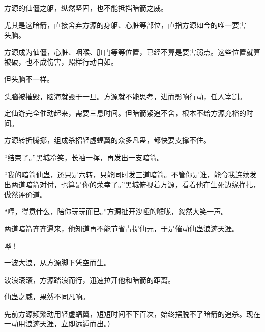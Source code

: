 \begin{this_body}
方源的仙僵之躯，纵然坚固，也不能抵挡暗箭之威。

尤其是这暗箭，直接舍弃方源的身躯、心脏等部位，直指方源如今的唯一要害――头脑。

方源成为仙僵，心脏、咽喉、肛门等等位置，已经不算是要害弱点。这些位置就算被破，也不成伤害，照样行动自如。

但头脑不一样。

头脑被摧毁，脑海就毁于一旦。方源就不能思考，进而影响行动，任人宰割。

定仙游完全催动起来，需要三息时间。但暗箭紧追不舍，根本不给方源充裕的时间。

方源转折腾挪，组成杀招轻虚蝠翼的众多凡蛊，都快要支撑不住。

“结束了。”黑城冷笑，长袖一挥，再发出一支暗箭。

“我的暗箭仙蛊，还只是六转，只能同时发三道暗箭。不管你是谁，能令我连续发出两道暗箭对付，也算是你的荣幸了。”黑城俯视着方源，看着他在生死边缘挣扎，傲然评价道。

“哼，得意什么，陪你玩玩而已。”方源扯开沙哑的喉咙，忽然大笑一声。

两道暗箭齐齐逼来，他知道再不能节省青提仙元，于是催动仙蛊浪迹天涯。

哗！

一波大浪，从方源脚下凭空而生。

波浪滚滚，方源踏浪而行，迅速拉开他和暗箭的距离。

仙蛊之威，果然不同凡响。

先前方源频繁动用轻虚蝠翼，短短时间不下百次，始终摆脱不了暗箭的追杀。现在一动用浪迹天涯，立即远遁而出。）

\end{this_body}

